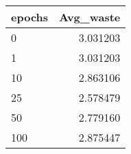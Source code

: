 \begin{tabular}{lr}
\toprule
epochs &  Avg\_waste \\
\midrule
     0 &   3.031203 \\
     1 &   3.031203 \\
    10 &   2.863106 \\
    25 &   2.578479 \\
    50 &   2.779160 \\
   100 &   2.875447 \\
\bottomrule
\end{tabular}
